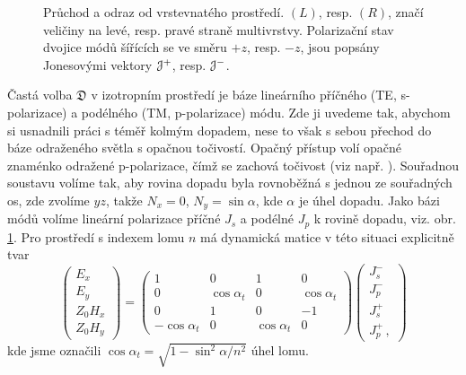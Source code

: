 \begin{figure}
    \centering
    
    \caption{Průchod a odraz od vrstevnatého prostředí. $(L)$, resp. $(R)$, značí veličiny na levé, resp. pravé straně multivrstvy. Polarizační stav dvojice módů šířících se ve směru $+z$, resp. $-z$, jsou popsány Jonesovými vektory $\mathcal{J}^+$, resp. $\mathcal{J}^-$.}
    \label{fig:odraz-pruchod}
\end{figure}

Častá volba $\mathfrak{D}$ v izotropním prostředí je báze lineárního příčného (TE, s-polarizace) a podélného (TM, p-polarizace) módu.
Zde ji uvedeme tak, abychom si usnadnili práci s téměř kolmým dopadem, nese to však s sebou přechod do báze odraženého světla s opačnou točivostí.
Opačný přístup volí opačné znaménko odražené p-polarizace, čímž se zachová točivost (viz např. \cite{silberQuadraticMagnetoopticKerr2019a}).
Souřadnou soustavu volíme tak, aby rovina dopadu byla rovnoběžná s jednou ze souřadných os, zde zvolíme $yz$, takže $N_x=0$, $N_y=\sin \alpha$, kde $\alpha$ je úhel dopadu.
Jako bázi módů volíme lineární polarizace příčné $J_s$ a podélné $J_p$ k rovině dopadu, viz. obr. \ref{fig:odraz-pruchod}.
Pro prostředí s indexem lomu $n$ má dynamická matice v této situaci explicitně tvar
\begin{equation}
    \begin{pmatrix} E_x \\ E_y \\ Z_0 H_x \\ Z_0 H_y \end{pmatrix}
    =\begin{pmatrix}
        1 & 0 & 1 & 0 \\
        0 & \cos\alpha_t & 0 & \cos\alpha_t \\
        0 & 1 & 0 & -1 \\
        -\cos\alpha_t & 0 & \cos\alpha_t & 0
    \end{pmatrix}
    \begin{pmatrix}
        J^-_{s} \\ J^-_{p} \\ J^+_s \\ J^+_{p} \,,
    \end{pmatrix}
\end{equation}
kde jsme označili $\cos \alpha_t = \sqrt{1-\sin^2 \alpha /n^2}$ úhel lomu.

